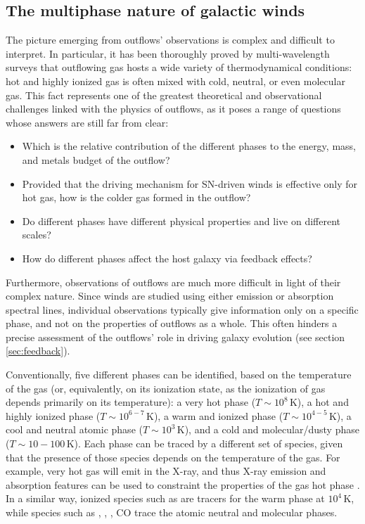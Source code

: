 \subsection{The multiphase nature of galactic winds} \label{sec:multiphase}



The picture emerging from outflows' observations is complex and difficult to interpret. In particular, it has been thoroughly proved by multi-wavelength surveys that outflowing gas hosts a wide variety of thermodynamical conditions: hot and highly ionized gas is often mixed with cold, neutral, or even molecular gas. This fact represents one of the greatest theoretical and observational challenges linked with the physics of outflows, as it poses a range of questions whose answers are still far from clear:
\begin{itemize}
    \item Which is the relative contribution of the different phases to the energy, mass, and metals budget of the outflow?
    \item Provided that the driving mechanism for SN-driven winds is effective only for hot gas, how is the colder gas formed in the outflow? 
    \item Do different phases have different physical properties and live on different scales?
    \item How do different phases affect the host galaxy via feedback effects? 
\end{itemize} 
Furthermore, observations of outflows are much more difficult in light of their complex nature. Since winds are studied using either emission or absorption spectral lines, individual observations typically give information only on a specific phase, and not on the properties of outflows as a whole. This often hinders a precise assessment of the outflows' role in driving galaxy evolution (see section \ref{sec:feedback}). 


Conventionally, five different phases can be identified, based on the temperature of the gas (or, equivalently, on its ionization state, as the ionization of gas depends primarily on its temperature): a very hot phase ($T\sim 10^8\,\mathrm{K}$), a hot and highly ionized phase ($T\sim 10^{6-7}\,\mathrm{K}$), a warm and ionized phase ($T\sim 10^{4-5}\,\mathrm{K}$), a cool and neutral atomic phase ($T\sim 10^3\,\mathrm{K}$), and a cold and molecular/dusty phase ($T\sim 10-100\,\mathrm{K}$). Each phase can be traced by a different set of species, given that the presence of those species depends on the temperature of the gas. For example, very hot gas will emit in the X-ray, and thus X-ray emission and absorption features can be used to constraint the properties of the gas hot phase \citep{Strickland:2000jg, strickland2009supernova}. In a similar way, ionized species such as \OIII are tracers for the warm phase at $10^4\,\mathrm{K}$, while species such as \CIIion, \HI, \HH, CO trace the atomic neutral and molecular phases. 

